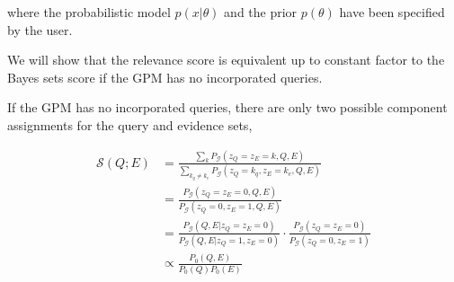 \documentclass{article}
\newcommand{\mG}{\mathcal{G}}
\begin{document}
where the probabilistic model $p(x|\theta)$ and the prior $p(\theta)$ 
have been specified by the user.

We will show that the relevance score is equivalent up to constant
factor to the Bayes sets score if the GPM has no incorporated
queries.

If the GPM has no incorporated queries, there are only
two possible component assignments for the query and evidence
sets,

\begin{align*}
  \mathcal{S}(Q;E) &= \frac{\sum_k P_\mG(z_Q=z_E=k,Q,E)}
                     {\sum_{k_q \neq k_e} P_\mG(z_Q=k_q, z_E=k_e,Q,E)}
\\
                   &= \frac{P_\mG(z_Q=z_E=0,Q,E)} 
                      {P_\mG(z_Q=0, z_E=1,Q,E)}
\\
                   &=\frac{P_\mG(Q,E|z_Q=z_E=0)}
                     {P_\mG(Q,E |z_Q=1, z_E=0)}
                     \cdot
                     \frac{P_\mG(z_Q=z_E=0)}
                     {P_\mG(z_Q=0, z_E=1)} 
\\
                   &\propto \frac{P_{0}(Q,E)}
                     {P_{0}(Q)P_{0}(E)}
\end{align*}
\end{document}
